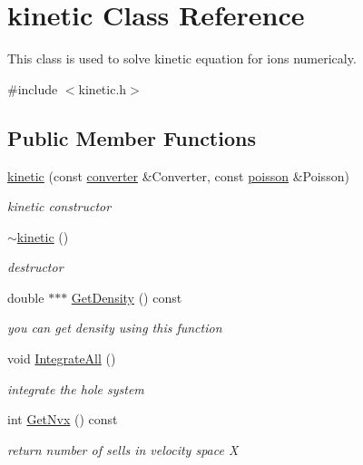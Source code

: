 \hypertarget{classkinetic}{}\section{kinetic Class Reference}
\label{classkinetic}


This class is used to solve kinetic equation for ions numericaly.  




{\ttfamily \#include $<$kinetic.\+h$>$}

\subsection*{Public Member Functions}
\begin{DoxyCompactItemize}
\item 
\mbox{\hyperlink{classkinetic_a9cb6588c4a9e87619ed78269299e07ca}{kinetic}} (const \mbox{\hyperlink{classconverter}{converter}} \&Converter, const \mbox{\hyperlink{classpoisson}{poisson}} \&Poisson)
\begin{DoxyCompactList}\small\item\em kinetic constructor \end{DoxyCompactList}\item 
\mbox{\hyperlink{classkinetic_a68a20ffcf1b59f154d2ca37c9776f35a}{$\sim$kinetic}} ()
\begin{DoxyCompactList}\small\item\em destructor \end{DoxyCompactList}\item 
double $\ast$$\ast$$\ast$ \mbox{\hyperlink{classkinetic_add83c6ebb9fbceed77e42abff478d56a}{Get\+Density}} () const
\begin{DoxyCompactList}\small\item\em you can get density using this function \end{DoxyCompactList}\item 
void \mbox{\hyperlink{classkinetic_a76cf34444249efa97fb73f710cc924ad}{Integrate\+All}} ()
\begin{DoxyCompactList}\small\item\em integrate the hole system \end{DoxyCompactList}\item 
int \mbox{\hyperlink{classkinetic_ab157d454b4a32922a97814ef768a2066}{Get\+Nvx}} () const
\begin{DoxyCompactList}\small\item\em return number of sells in velocity space X \end{DoxyCompactList}\item 

\end{DoxyCompactItemize}

